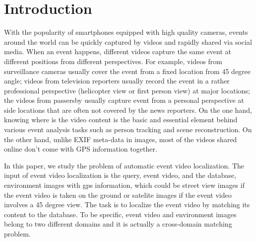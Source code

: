 \section{Introduction}
With the popularity of smartphones equipped with high quality cameras, events around the world can be quickly captured by videos and rapidly shared via social media.
When an event happens, different videos capture the same event at different positions from different perspectives.
For example, videos from surveillance cameras usually cover the event from a fixed location from 45 degree angle; 
videos from television reporters usually record the event in a rather professional perspective (helicopter view or first person view) at major locations; 
the videos from passersby usually capture event from a personal perspective at side locations that are often not covered by the news reporters.
On the one hand, knowing where is the video content is the basic and essential element behind various event analysis tasks such as person tracking and scene reconstruction. 
On the other hand, unlike EXIF meta-data in images, most of the videos shared online don't come with GPS information together. 

In this paper, we study the problem of automatic event video localization. 
The input of event video localization is the query, event video, and the database, environment images with gps information, which could be street view images if the event video is taken on the ground or satelite images if the event video involves a 45 degree view. 
The task is to localize the event video by matching its content to the database. 
To be specific, event video and environment images belong to two different domains and it is actually a cross-domain matching problem.  

